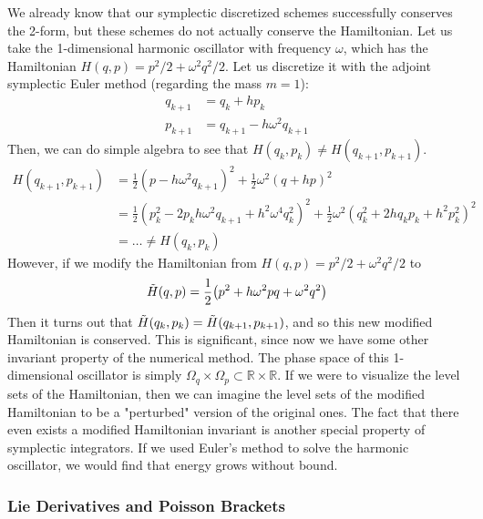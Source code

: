\documentclass{article}
\begin{document}
    We already know that our symplectic discretized schemes successfully conserves the 2-form, but these schemes do not actually conserve the Hamiltonian. Let us take the 1-dimensional harmonic oscillator with frequency $\omega$, which has the Hamiltonian $H(q, p) = p^2/2 + \omega^2 q^2/2$. Let us discretize it with the adjoint symplectic Euler method (regarding the mass $m = 1$): 
    \begin{align*}
      q_{k+1} & = q_k + h p_k \\ 
      p_{k+1} & = q_{k+1} - h \omega^2 q_{k+1}
    \end{align*}
    Then, we can do simple algebra to see that $H(q_k, p_k) \neq H(q_{k+1}, p_{k+1})$. 
    \begin{align*}
      H(q_{k+1}, p_{k+1}) & = \frac{1}{2} (p - h \omega^2 q_{k+1})^2 + \frac{1}{2} \omega^2 (q + h p)^2 \\
      & = \frac{1}{2} (p_k^2 - 2p_kh \omega^2 q_{k+1} + h^2 \omega^4 q_k^2)^2 + \frac{1}{2} \omega^2 (q_k^2 + 2hq_k p_k + h^2 p_k^2)^2 \\
      &  = \ldots \neq H(q_k, p_k) 
    \end{align*}
    However, if we modify the Hamiltonian from $H(q, p) = p^2 /2 + \omega^2 q^2 / 2$ to 
    \begin{equation}
      \Tilde{H} (q, p) = \frac{1}{2} \big( p^2 + h \omega^2 p q + \omega^2 q^2 \big)
    \end{equation}
    Then it turns out that $\Tilde{H}(q_k, p_k) = \Tilde{H}(q_{k+1}, p_{k+1})$, and so this new modified Hamiltonian is conserved. This is significant, since now we have some other invariant property of the numerical method. The phase space of this 1-dimensional oscillator is simply $\Omega_q \times \Omega_p \subset \mathbb{R} \times \mathbb{R}$. If we were to visualize the level sets of the Hamiltonian, then we can imagine the level sets of the modified Hamiltonian to be a "perturbed" version of the original ones. The fact that there even exists a modified Hamiltonian invariant is another special property of symplectic integrators. If we used Euler's method to solve the harmonic oscillator, we would find that energy grows without bound. 

    \subsubsection{Lie Derivatives and Poisson Brackets}
\end{document}
